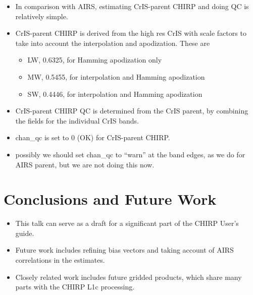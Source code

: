 \documentclass[12pt]{article}
\begin{document}
\begin{itemize}

  \item In comparison with AIRS, estimating CrIS-parent
    CHIRP {\nedn} and doing QC is relatively simple.

  \item CrIS-parent CHIRP {\nedn} is derived from the high
    res CrIS {\nedn} with scale factors to take into account the
    interpolation and apodization.  These are
    \begin{itemize}
      \item LW, 0.6325, for Hamming apodization only
      \item MW, 0.5455, for interpolation and Hamming apodization
      \item SW, 0.4446, for interpolation and Hamming apodization
    \end{itemize}

  \item CrIS-parent CHIRP QC is determined from the CrIS
    parent, by combining the fields for the individual CrIS bands.

  \item chan\_qc is set to 0 (OK) for CrIS-parent CHIRP.

  \item possibly we should set chan\_qc to ``warn'' at the band
    edges, as we do for AIRS parent, but we are not doing this
    now.

\end{itemize}


\section{Conclusions and Future Work}
\begin{itemize}

  \item This talk can serve as a draft for a significant part of the
    CHIRP User's guide.

  \item Future work includes refining bias vectors and taking
    account of AIRS correlations in the {\nedn} estimates.

  \item Closely related work includes future gridded products, which
    share many parts with the CHIRP L1c processing.


\end{itemize}

\end{document}
